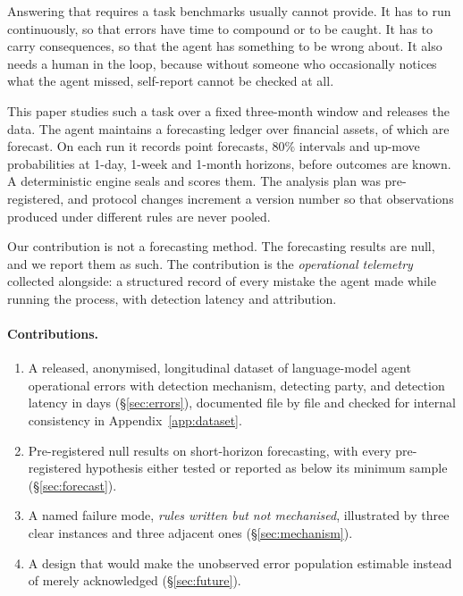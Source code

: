 \documentclass[11pt,a4paper]{article}
\begin{document}
Answering that requires a task benchmarks usually cannot provide. It has to
run continuously, so that errors have time to compound or to be caught. It has
to carry consequences, so that the agent has something to be wrong about. It
also needs a human in the loop, because without someone who occasionally
notices what the agent missed, self-report cannot be checked at all.

This paper studies such a task over a fixed three-month window and releases
the data. The agent maintains a forecasting ledger over \NumAssets{} financial
assets, \NumForecastAssets{} of which are forecast. On each run it records
point forecasts, $80\%$ intervals and up-move probabilities at 1-day, 1-week
and 1-month horizons, before outcomes are known. A deterministic engine seals
and scores them. The analysis plan was pre-registered, and protocol changes
increment a version number so that observations produced under different rules
are never pooled.

Our contribution is not a forecasting method. The forecasting results are
null, and we report them as such. The contribution is the \emph{operational
telemetry} collected alongside: a structured record of every mistake the agent
made while running the process, with detection latency and attribution.

\paragraph{Contributions.}
\begin{enumerate}
  \item A released, anonymised, longitudinal dataset of language-model agent
        operational errors with detection mechanism, detecting party, and
        detection latency in days (\S\ref{sec:errors}), documented file by
        file and checked for internal consistency in
        Appendix~\ref{app:dataset}.
  \item Pre-registered null results on short-horizon forecasting, with every
        pre-registered hypothesis either tested or reported as below its
        minimum sample (\S\ref{sec:forecast}).
  \item A named failure mode, \emph{rules written but not mechanised},
        illustrated by three clear instances and three adjacent ones
        (\S\ref{sec:mechanism}).
  \item A design that would make the unobserved error population estimable
        instead of merely acknowledged (\S\ref{sec:future}).
\end{enumerate}
\end{document}
